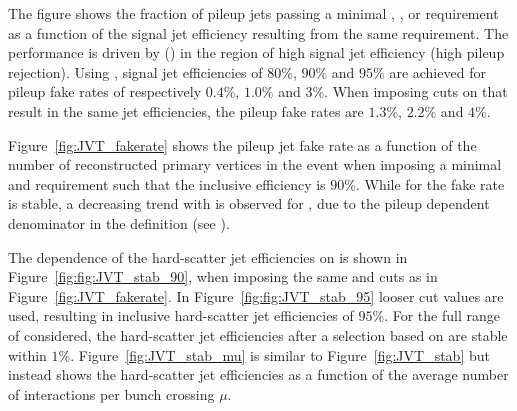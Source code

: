 \documentclass{atlasnote}
\begin{document}
The figure shows the fraction of pileup jets 
passing a minimal \JVF, \cJVF, \RpT or \JVT requirement as a function of the signal jet efficiency 
resulting from the same requirement. The \JVT performance is driven by \cJVF (\RpT) in the region of high 
signal jet efficiency (high pileup rejection). Using \JVT, signal jet efficiencies of $80\%$, $90\%$ and $95\%$ are achieved for pileup fake 
rates of respectively $0.4\%$, $1.0\%$ and $3\%$. When imposing cuts on \JVF that result in the same jet efficiencies, the pileup fake rates are $1.3\%$, $2.2\%$ and $4\%$. 

Figure~\ref{fig:JVT_fakerate} shows the pileup jet fake rate as a function of the number of reconstructed primary vertices in the event
when imposing a minimal \JVT and \JVF requirement such that the \NPV inclusive efficiency is $90\%$. While for \JVT the 
fake rate is stable, a decreasing trend with  \NPV is observed for \JVF, due to the pileup dependent denominator in the \JVF definition 
(see ). 

The dependence of the hard-scatter jet efficiencies on \NPV is shown in Figure~\ref{fig:fig:JVT_stab_90}, when imposing the same \JVF and \JVT cuts as in 
Figure~\ref{fig:JVT_fakerate}. In Figure~\ref{fig:fig:JVT_stab_95} looser cut values are used, resulting in \NPV inclusive hard-scatter jet efficiencies of $95\%$.
For the full range of \NPV considered, the hard-scatter 
jet efficiencies after a selection based on \JVT are stable within $1\%$.
Figure~\ref{fig:JVT_stab_mu} is similar to Figure~\ref{fig:JVT_stab} but instead shows the hard-scatter jet efficiencies as a function of 
the average number of interactions per bunch crossing $\mu$. 
\end{document}
